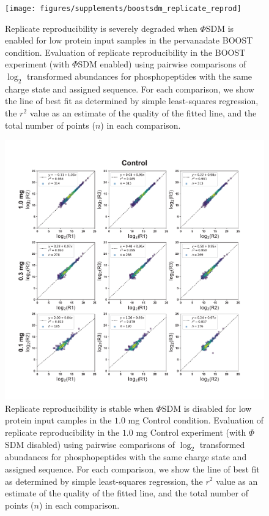 \documentclass[journal=jprobs,manuscript=article]{achemso}
\begin{document}
\clearpage

\begin{figure}[t!]
\centering
\texttt{[image: figures/supplements/boostsdm\_replicate\_reprod]}
\caption{Replicate reproducibility is severely degraded when $\Phi$SDM is enabled for low protein input samples in the pervanadate BOOST condition. Evaluation of replicate reproducibility in the BOOST experiment (with $\Phi$SDM enabled) using pairwise comparisons of $\log_2$ transformed abundances for phosphopeptides with the same charge state and assigned sequence. For each comparison, we show the line of best fit as determined by simple least-squares regression, the $r^2$ value as an estimate of the quality of the fitted line, and the total number of points ($n$) in each comparison. }\label{boostsdm_replicate_reprod}
\end{figure}

\clearpage

\begin{figure}[t!]
\centering
\includegraphics[width=175mm]{figures/supplements/control_replicate_reprod.pdf}
\caption{Replicate reproducibility is stable when $\Phi$SDM is disabled for low protein input camples in the $1.0$ mg Control condition. Evaluation of replicate reproducibility in the $1.0$ mg Control experiment (with $\Phi$SDM disabled) using pairwise comparisons of $\log_2$ transformed abundances for phosphopeptides with the same charge state and assigned sequence. For each comparison, we show the line of best fit as determined by simple least-squares regression, the $r^2$ value as an estimate of the quality of the fitted line, and the total number of points ($n$) in each comparison. }\label{control_replicate_reprod}
\end{figure}
\end{document}
